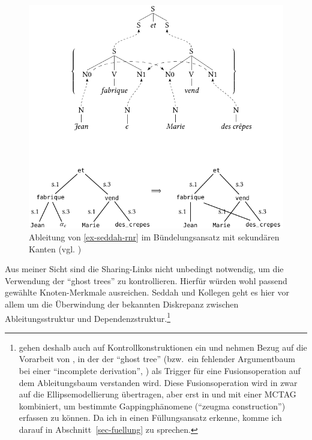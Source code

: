 \begin{figure}[t]
\centering
\includegraphics{graphics/abb813.pdf}
\caption{\label{fig-seddah-rnr-2}Ableitung von \ref{ex-seddah-rnr} im Bündelungsansatz mit sekundären Kanten (vgl. \citealt[Figure~2]{Seddah:etal:10})}
\end{figure}
   
Aus meiner Sicht sind die Sharing-Links nicht unbedingt notwendig, um die Verwendung der "`ghost trees"' zu kontrollieren. Hierfür würden wohl passend gewählte Knoten-Merkmale ausreichen. Seddah und Kollegen geht es hier vor allem um die Überwindung der bekannten Diskrepanz zwischen Ableitungsstruktur und Dependenzstruktur.\footnote{\cite{Seddah:etal:10} gehen deshalb auch auf Kontrollkonstruktionen ein und nehmen Bezug auf die Vorarbeit von \cite{Seddah:Gaiffe:05}, in der der "`ghost tree"' (bzw.\ ein fehlender Argumentbaum bei einer "`incomplete derivation"', \citealt[292]{Seddah:Gaiffe:05}) als Trigger für eine Fusionsoperation auf dem Ableitungsbaum verstanden wird. Diese Fusionsoperation wird in \cite{Seddah:Sagot:06} zwar auf die Ellipsemodellierung übertragen, aber erst in \cite{Seddah:08} und \cite{Seddah:etal:10} mit einer MCTAG kombiniert, um bestimmte Gappingphänomene ("`zeugma construction"') erfassen zu können. Da ich in \cite{Seddah:Sagot:06} einen Füllungsansatz erkenne, komme ich darauf in Abschnitt~\ref{sec-fuellung} zu sprechen.} 



